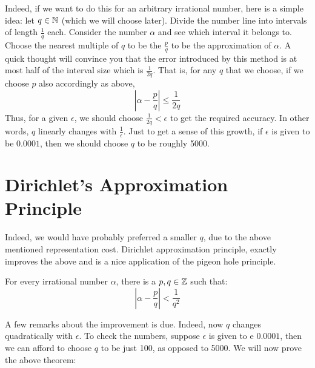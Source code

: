 Indeed, if we want to do this for an arbitrary irrational number, here is a simple idea: let $q \in \mathbb{N}$ (which we will choose later). Divide the number line into intervals of length $\frac{1}{q}$ each. Consider the number $\alpha$ and see which interval it belongs to. Choose the nearest multiple of $q$ to be the $\frac{p}{q}$ to be the approximation of $\alpha$. A quick thought will convince you that the error introduced by this method is at most half of the interval size which is $\frac{1}{2q}$. That is, for any $q$ that we choose, if we choose $p$ also accordingly as above,
$$ \left| \alpha - \frac{p}{q} \right| \le \frac{1}{2q} $$
Thus, for a given $\epsilon$, we should choose $\frac{1}{2q} < \epsilon$ to get the required accuracy. In other words, $q$ linearly changes with $\frac{1}{\epsilon}$. Just to get a sense of this growth, if $\epsilon$ is given to be $0.0001$, then we should choose $q$ to be roughly 5000. 

\section{Dirichlet's Approximation Principle}

Indeed, we would have probably preferred a smaller $q$, due to the above mentioned representation cost. Dirichlet approximation principle, exactly improves the above and is a nice application of the pigeon hole principle.

\begin{theorem}
For every irrational number $\alpha$, there is a $p, q \in {\mathbb{Z}}$ such that:
$$\left| \alpha - \frac{p}{q} \right| < \frac{1}{q^2}$$
\end{theorem}

A few remarks about the improvement  is due. Indeed, now $q$ changes quadratically with $\epsilon$. To check the numbers, suppose $\epsilon$ is given to e $0.0001$, then we can afford to choose $q$ to be just 100, as opposed to 5000.  We will now prove the above theorem:

